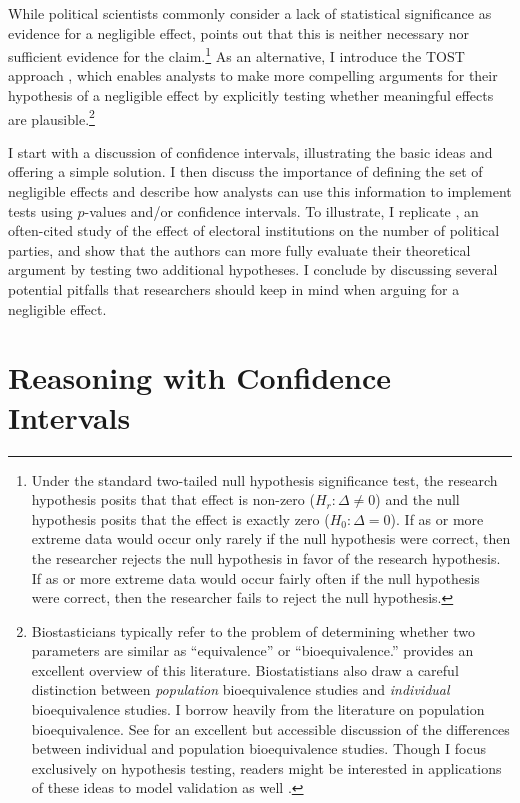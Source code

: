 \documentclass[12pt]{article}
\begin{document}
While political scientists commonly consider a lack of statistical significance as evidence for a negligible effect,  \cite{Westlake1979} points out that this is neither necessary nor sufficient evidence for the claim.\footnote{Under the standard two-tailed null hypothesis significance test, the research hypothesis posits that that effect is non-zero ($H_r : \Delta \neq 0$) and the null hypothesis posits that the effect is exactly zero ($H_0 : \Delta = 0$). If as or more extreme data would occur only rarely if the null hypothesis were correct, then the researcher rejects the null hypothesis in favor of the research hypothesis. If as or more extreme data would occur fairly often if the null hypothesis were correct, then the researcher fails to reject the null hypothesis.} As an alternative, I introduce the TOST approach \citep{BergerHsu1996}, which enables analysts to make more compelling arguments for their hypothesis of a negligible effect by explicitly testing whether meaningful effects are plausible.\footnote{Biostasticians typically refer to the problem of determining whether two parameters are similar as ``equivalence'' or ``bioequivalence.'' \cite{Wellek2010} provides an excellent overview of this literature. Biostatistians also draw a careful distinction between \textit{population} bioequivalence studies and \textit{individual} bioequivalence studies. I borrow heavily from the literature on population bioequivalence. See \cite{Anderson1993} for an excellent but accessible discussion of the differences between individual and population bioequivalence studies. Though I focus exclusively on hypothesis testing, readers might be interested in applications of these ideas to model validation as well \citep{RobinsonFroese2004, RobinsonDuursmaMarshall2005}.} 

I start with a discussion of confidence intervals, illustrating the basic ideas and offering a simple solution. I then discuss the importance of defining the set of negligible effects and describe how analysts can use this information to implement tests using $p$-values and/or confidence intervals.
To illustrate, I replicate \cite{ClarkGolder2006}, an often-cited study of the effect of electoral institutions on the number of political parties, and show that the authors can more fully evaluate their theoretical argument by testing two additional hypotheses. I conclude by discussing several potential pitfalls that researchers should keep in mind when arguing for a negligible effect.

\section*{Reasoning with Confidence Intervals}
\end{document}
